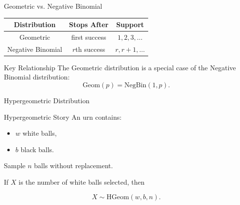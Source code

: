 \begin{frame}{Geometric vs. Negative Binomial}
\begin{center}
\renewcommand{\arraystretch}{1.4}
\begin{tabular}{ccc}
\toprule
Distribution & Stops After & Support \\
\midrule
Geometric & first success & $1,2,3,\dots$ \\
Negative Binomial & $r$th success & $r,r+1,\dots$ \\
\bottomrule
\end{tabular}
\end{center}

\vspace{0.35cm}

\begin{keybox}{Key Relationship}
The Geometric distribution is a special case of the Negative Binomial distribution:
\[
\text{Geom}(p)=\text{NegBin}(1,p).
\]
\end{keybox}
\end{frame}





































\begin{frame}{Hypergeometric Distribution}
\begin{keybox}{Hypergeometric Story}
An urn contains:
\begin{itemize}
    \item $w$ white balls,
    \item $b$ black balls.
\end{itemize}

Sample $n$ balls without replacement.

If $X$ is the number of white balls selected, then

\[
X\sim\text{HGeom}(w,b,n).
\]
\end{keybox}
\end{frame}







